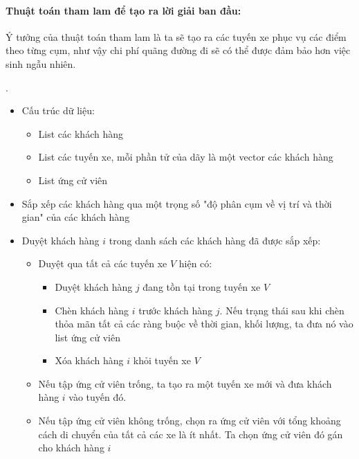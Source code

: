 \documentclass[12pt,a4paper]{article}\author{Nguyễn Nho Dũng}
\begin{document}
\paragraph*{Thuật toán tham lam để tạo ra lời giải ban đầu:} Ý tưởng của thuật toán tham lam là ta sẽ tạo ra các tuyến xe phục vụ các điểm theo từng cụm, như vậy chi phí quãng đường đi sẽ có thể được đảm bảo  hơn việc sinh ngẫu nhiên.
\begin{thuattoan} .
	\begin{itemize}
		\item Cấu trúc dữ liệu:
		\begin{itemize}
			\item List các khách hàng
			\item List các tuyến xe, mỗi phần tử của dãy là một vector các khách hàng
			\item List ứng cử viên
		\end{itemize}
		\item Sắp xếp các khách hàng qua một trọng số "độ phân cụm về vị trí và thời gian" của các khách hàng
		\item Duyệt khách hàng $i$ trong danh sách các khách hàng đã được sắp xếp:
		\begin{itemize}
			\item Duyệt qua tất cả các tuyến xe $V$ hiện có:
			\begin{itemize}
				\item Duyệt khách hàng $j$ đang tồn tại trong tuyến xe $V$
				\item Chèn khách hàng $i$ trước khách hàng $j$. Nếu trạng thái sau khi chèn thỏa mãn tất cả các ràng buộc về thời gian, khối lượng, ta đưa nó vào list ứng cử viên
				\item Xóa khách hàng $i$ khỏi tuyến xe $V$
			\end{itemize}
			\item Nếu tập ứng cử viên trống, ta tạo ra một tuyến xe mới và đưa khách hàng $i$ vào tuyến đó.
			\item Nếu tập ứng cử viên không trống, chọn ra ứng cử viên với tổng khoảng cách di chuyển của tất cả các xe là ít nhất. Ta chọn ứng cử viên đó gán cho khách hàng $i$
		\end{itemize}
	\end{itemize}
\end{thuattoan}
\end{document}
